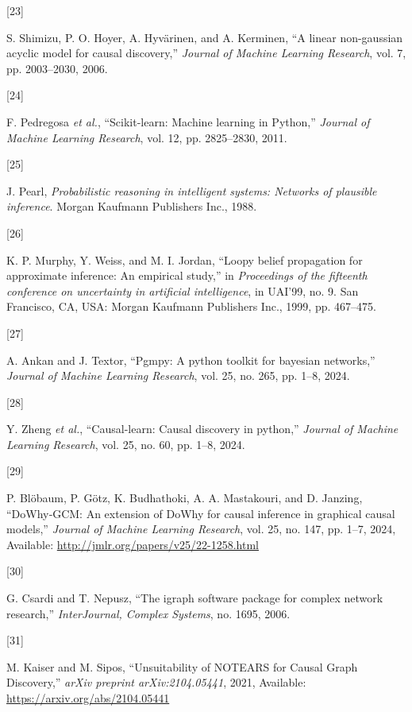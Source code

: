 \documentclass[
]{article}
\newlength{\cslhangindent}
\newlength{\csllabelwidth}
\newenvironment{CSLReferences}[2] %
 {\begin{list}{}{%
  \setlength{\itemindent}{0pt}
  \setlength{\leftmargin}{0pt}
  \setlength{\parsep}{0pt}
  \ifodd #1
   \setlength{\leftmargin}{\cslhangindent}
   \setlength{\itemindent}{-1\cslhangindent}
  \fi
  \setlength{\itemsep}{#2\baselineskip}}}
 {\end{list}}
\newcommand{\CSLLeftMargin}[1]{\parbox[t]{\csllabelwidth}{\strut#1\strut}}
\newcommand{\CSLRightInline}[1]{\parbox[t]{\linewidth - \csllabelwidth}{\strut#1\strut}}
\theoremstyle{definition}
\theoremstyle{remark}
\begin{document}
\begin{CSLReferences}{0}{0}
\CSLLeftMargin{{[}23{]} }%
\CSLRightInline{S. Shimizu, P. O. Hoyer, A. Hyvärinen, and A. Kerminen,
{``A linear non-gaussian acyclic model for causal discovery,''}
\emph{Journal of Machine Learning Research}, vol. 7, pp. 2003--2030,
2006.}

\CSLLeftMargin{{[}24{]} }%
\CSLRightInline{F. Pedregosa \emph{et al.}, {``Scikit-learn: Machine
learning in {P}ython,''} \emph{Journal of Machine Learning Research},
vol. 12, pp. 2825--2830, 2011.}

\CSLLeftMargin{{[}25{]} }%
\CSLRightInline{J. Pearl, \emph{Probabilistic reasoning in intelligent
systems: Networks of plausible inference}. Morgan Kaufmann Publishers
Inc., 1988.}

\CSLLeftMargin{{[}26{]} }%
\CSLRightInline{K. P. Murphy, Y. Weiss, and M. I. Jordan, {``Loopy
belief propagation for approximate inference: An empirical study,''} in
\emph{Proceedings of the fifteenth conference on uncertainty in
artificial intelligence}, in UAI'99, no. 9. San Francisco, CA, USA:
Morgan Kaufmann Publishers Inc., 1999, pp. 467--475.}

\CSLLeftMargin{{[}27{]} }%
\CSLRightInline{A. Ankan and J. Textor, {``Pgmpy: A python toolkit for
bayesian networks,''} \emph{Journal of Machine Learning Research}, vol.
25, no. 265, pp. 1--8, 2024.}

\CSLLeftMargin{{[}28{]} }%
\CSLRightInline{Y. Zheng \emph{et al.}, {``Causal-learn: Causal
discovery in python,''} \emph{Journal of Machine Learning Research},
vol. 25, no. 60, pp. 1--8, 2024.}

\CSLLeftMargin{{[}29{]} }%
\CSLRightInline{P. Blöbaum, P. Götz, K. Budhathoki, A. A. Mastakouri,
and D. Janzing, {``DoWhy‑GCM: An extension of DoWhy for causal inference
in graphical causal models,''} \emph{Journal of Machine Learning
Research}, vol. 25, no. 147, pp. 1--7, 2024, Available:
\url{http://jmlr.org/papers/v25/22-1258.html}}

\CSLLeftMargin{{[}30{]} }%
\CSLRightInline{G. Csardi and T. Nepusz, {``The igraph software package
for complex network research,''} \emph{InterJournal, Complex Systems},
no. 1695, 2006.}

\CSLLeftMargin{{[}31{]} }%
\CSLRightInline{M. Kaiser and M. Sipos, {``{Unsuitability of NOTEARS for
Causal Graph Discovery},''} \emph{arXiv preprint arXiv:2104.05441},
2021, Available: \url{https://arxiv.org/abs/2104.05441}}

\end{CSLReferences}
\end{document}

